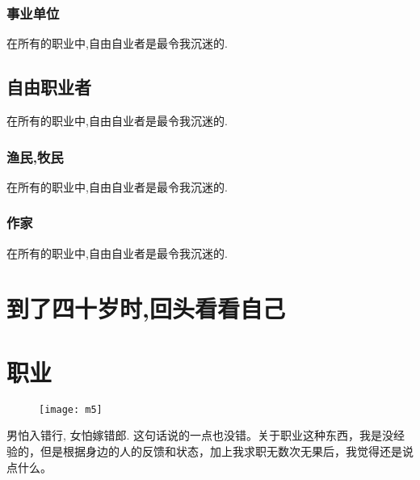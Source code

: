 \documentclass[utf8]{book}
\begin{document}
\subsection{事业单位}
\begin{onehalfspace}
	在所有的职业中,自由自业者是最令我沉迷的.
\end{onehalfspace}

\section{自由职业者}

\begin{onehalfspace}
	在所有的职业中,自由自业者是最令我沉迷的.
\end{onehalfspace}

\subsection{渔民,牧民}
\begin{onehalfspace}
	在所有的职业中,自由自业者是最令我沉迷的.
\end{onehalfspace}

\subsection{作家}
\begin{onehalfspace}
	在所有的职业中,自由自业者是最令我沉迷的.
\end{onehalfspace} 




\chapter{到了四十岁时,回头看看自己}


\chapter{职业}

	\begin{figure}[H]
	\centering
	\texttt{[image: m5]}
	\end{figure}

	\indent 男怕入错行, 女怕嫁错郎. 这句话说的一点也没错。关于职业这种东西，我是没经验的，但是根据身边的人的反馈和状态，加上我求职无数次无果后，我觉得还是说点什么。
	
\end{document}
